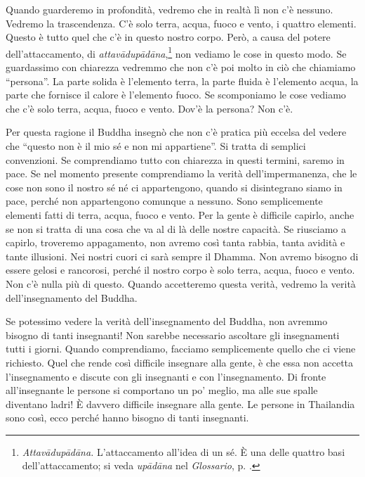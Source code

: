 Quando guarderemo in profondità, vedremo che in realtà lì
non c'è nessuno. Vedremo la trascendenza. C'è solo terra, acqua, fuoco e
vento, i quattro elementi. Questo è tutto quel che c'è in questo nostro
corpo. Però, a causa del potere dell'attaccamento, di
\emph{attavādupādāna},\footnote{\emph{Attavādupādāna.} L'attaccamento
  all'idea di un sé. È una delle quattro basi dell'attaccamento; si
  veda \emph{upādāna} nel \emph{Glossario}, p. \pageref{glossary-upadana}.} non vediamo le cose in
questo modo. Se guardassimo con chiarezza vedremmo che non c'è poi molto
in ciò che chiamiamo ``persona''. La parte solida è l'elemento terra, la
parte fluida è l'elemento acqua, la parte che fornisce il calore è
l'elemento fuoco. Se scomponiamo le cose vediamo che c'è solo terra,
acqua, fuoco e vento. Dov'è la persona? Non c'è.

Per questa ragione il Buddha insegnò che non c'è pratica più eccelsa del
vedere che ``questo non è il mio sé e non mi appartiene''. Si tratta di
semplici convenzioni. Se comprendiamo tutto con chiarezza in questi
termini, saremo in pace. Se nel momento presente comprendiamo la verità
dell'impermanenza, che le cose non sono il nostro sé né ci appartengono,
quando si disintegrano siamo in pace, perché non appartengono comunque a
nessuno. Sono semplicemente elementi fatti di terra, acqua, fuoco e
vento. Per la gente è difficile capirlo, anche se non si tratta di una
cosa che va al di là delle nostre capacità. Se riusciamo a capirlo,
troveremo appagamento, non avremo così tanta rabbia, tanta avidità e
tante illusioni. Nei nostri cuori ci sarà sempre il Dhamma. Non avremo
bisogno di essere gelosi e rancorosi, perché il nostro corpo è solo
terra, acqua, fuoco e vento. Non c'è nulla più di questo. Quando
accetteremo questa verità, vedremo la verità dell'insegnamento del
Buddha.

Se potessimo vedere la verità dell'insegnamento del Buddha, non avremmo
bisogno di tanti insegnanti! Non sarebbe necessario ascoltare gli
insegnamenti tutti i giorni. Quando comprendiamo, facciamo semplicemente
quello che ci viene richiesto. Quel che rende così difficile insegnare
alla gente, è che essa non accetta l'insegnamento e discute con gli
insegnanti e con l'insegnamento. Di fronte all'insegnante le persone si
comportano un po' meglio, ma alle sue spalle diventano ladri! È davvero
difficile insegnare alla gente. Le persone in Thailandia sono così, ecco
perché hanno bisogno di tanti insegnanti.

